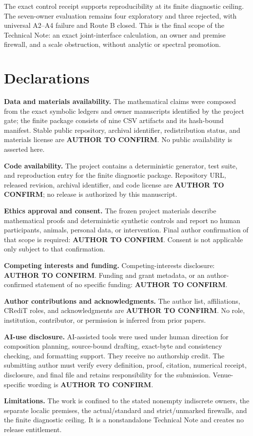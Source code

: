 \documentclass[12pt]{article}
\theoremstyle{definition}
\begin{document}
The exact control receipt supports reproducibility at its finite diagnostic ceiling.  The seven-owner evaluation remains four exploratory and three rejected, with universal A2--A4 failure and Route B closed.  This is the final scope of the Technical Note: an exact joint-interface calculation, an owner and premise firewall, and a scale obstruction, without analytic or spectral promotion.

\section*{Declarations}

\noindent\textbf{Data and materials availability.}
The mathematical claims were composed from the exact symbolic ledgers and owner manuscripts identified by the project gate; the finite package consists of nine CSV artifacts and its hash-bound manifest.  Stable public repository, archival identifier, redistribution status, and materials license are \textbf{AUTHOR TO CONFIRM}.  No public availability is asserted here.

\noindent\textbf{Code availability.}
The project contains a deterministic generator, test suite, and reproduction entry for the finite diagnostic package.  Repository URL, released revision, archival identifier, and code license are \textbf{AUTHOR TO CONFIRM}; no release is authorized by this manuscript.

\noindent\textbf{Ethics approval and consent.}
The frozen project materials describe mathematical proofs and deterministic synthetic controls and report no human participants, animals, personal data, or intervention.  Final author confirmation of that scope is required: \textbf{AUTHOR TO CONFIRM}.  Consent is not applicable only subject to that confirmation.

\noindent\textbf{Competing interests and funding.}
Competing-interests disclosure: \textbf{AUTHOR TO CONFIRM}.  Funding and grant metadata, or an author-confirmed statement of no specific funding: \textbf{AUTHOR TO CONFIRM}.

\noindent\textbf{Author contributions and acknowledgments.}
The author list, affiliations, CRediT roles, and acknowledgments are \textbf{AUTHOR TO CONFIRM}.  No role, institution, contributor, or permission is inferred from prior papers.

\noindent\textbf{AI-use disclosure.}
AI-assisted tools were used under human direction for composition planning, source-bound drafting, exact-byte and consistency checking, and formatting support.  They receive no authorship credit.  The submitting author must verify every definition, proof, citation, numerical receipt, disclosure, and final file and retains responsibility for the submission.  Venue-specific wording is \textbf{AUTHOR TO CONFIRM}.

\noindent\textbf{Limitations.}
The work is confined to the stated nonempty indiscrete owners, the separate localic premises, the actual/standard and strict/unmarked firewalls, and the finite diagnostic ceiling.  It is a nonstandalone Technical Note and creates no release entitlement.

\begingroup
\raggedright


\endgroup
\end{document}
